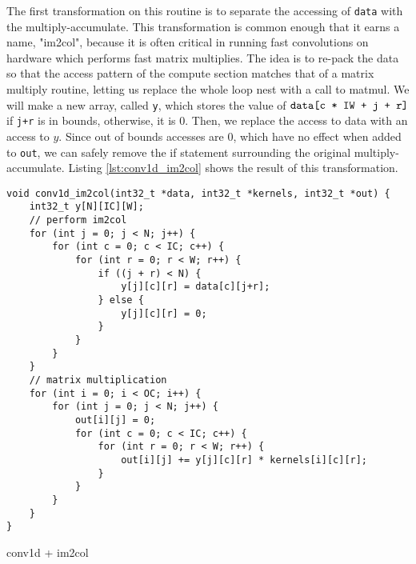 \documentclass[acmsmall, nonacm=true]{acmart}
\begin{document}
The first transformation on this routine is to separate the accessing of \verb|data| with the multiply-accumulate. This transformation is common enough that it earns a name, "im2col", because it is often critical in running fast convolutions on hardware which performs fast matrix multiplies. The idea is to re-pack the data so that the access pattern of the compute section matches that of a matrix multiply routine, letting us replace the whole loop nest with a call to matmul. We will make a new array, called \verb|y|, which stores the value of $\verb|data[c * IW + j + r]|$ if \verb|j+r| is in bounds, otherwise, it is 0. Then, we replace the access to data with an access to $y$. Since out of bounds accesses are $0$, which have no effect when added to \verb|out|, we can safely remove the if statement surrounding the original multiply-accumulate. Listing \ref{lst:conv1d_im2col} shows the result of this transformation.

\begin{listing}
    \centering
    \begin{verbatim}
void conv1d_im2col(int32_t *data, int32_t *kernels, int32_t *out) {
    int32_t y[N][IC][W];
    // perform im2col
    for (int j = 0; j < N; j++) {
        for (int c = 0; c < IC; c++) {
            for (int r = 0; r < W; r++) {
                if ((j + r) < N) {
                    y[j][c][r] = data[c][j+r];
                } else {
                    y[j][c][r] = 0;
                }                    
            }
        }
    }
    // matrix multiplication
    for (int i = 0; i < OC; i++) {
        for (int j = 0; j < N; j++) {
            out[i][j] = 0;
            for (int c = 0; c < IC; c++) {
                for (int r = 0; r < W; r++) {
                    out[i][j] += y[j][c][r] * kernels[i][c][r];
                }
            }
        }
    }
}
\end{verbatim}
    \caption{conv1d + im2col}
    \label{lst:conv1d_im2col}
\end{listing}
\end{document}

